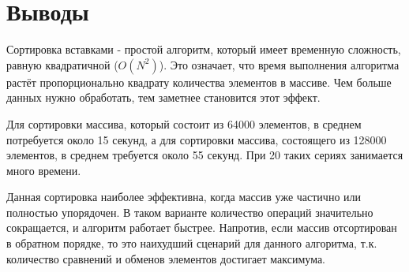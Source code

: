 \documentclass[12pt, a4paper]{report}
\begin{document}
	\section*{Выводы}
	Сортировка вставками - простой алгоритм, который имеет временную сложность, равную квадратичной (\( O(N^2) \)). Это означает, что время выполнения алгоритма растёт пропорционально квадрату количества элементов в массиве. Чем больше данных нужно обработать, тем заметнее становится этот эффект. \par
	Для сортировки массива, который состоит из 64000 элементов, в среднем потребуется около 15 секунд, а для сортировки массива, состоящего из 128000 элементов, в среднем требуется около 55 секунд. При 20 таких сериях занимается много времени. \par
	Данная сортировка наиболее эффективна, когда массив уже частично или полностью упорядочен. В таком варианте количество операций значительно сокращается, и алгоритм работает быстрее. Напротив, если массив отсортирован в обратном порядке, то это наихудший сценарий для данного алгоритма, т.к. количество сравнений и обменов элементов достигает максимума.
\end{document}
